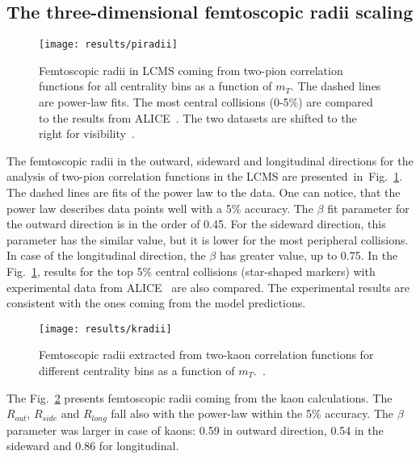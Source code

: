     \subsection{The three-dimensional femtoscopic radii scaling}
      \begin{figure}[b]
        \centering
        \centerline{\texttt{[image: results/piradii]}}
        \caption{Femtoscopic radii in LCMS coming from two-pion correlation functions for all centrality bins as a function of $m_T$. The dashed lines are power-law fits. The most central collisions (0-5\%) are compared to the results from ALICE~\cite{alice_pion}. The two datasets are shifted to the right for visibility~\cite{galazyn}.}
        \label{fig:piradii}
      \end{figure}

      The femtoscopic radii in the outward, sideward and longitudinal directions for the analysis of two-pion correlation functions in the LCMS are presented~in~Fig.~\ref{fig:piradii}.
      The dashed lines are fits of the power law to the data.
      One can notice, that the power law describes data points well with a 5\% accuracy.
      The $\beta$ fit parameter for the outward direction is in the order of 0.45.
      For the sideward direction, this parameter has the similar value, but it is lower for the most peripheral collisions.
      In case of the longitudinal direction, the $\beta$ has greater value, up to 0.75.
      In the Fig.~\ref{fig:piradii}, results for the top 5\% central collisions (star-shaped markers) with experimental data from ALICE~\cite{alice_pion} are also compared.
      The experimental results are consistent with the ones coming from the model predictions.
      \begin{figure}[b]
        \centering
        \centerline{\texttt{[image: results/kradii]}}
        \caption{Femtoscopic radii extracted from two-kaon correlation functions for different centrality bins as a function of $m_T$.~\cite{galazyn}.}
      \label{fig:kradii}
      \end{figure}

      The Fig.~\ref{fig:kradii} presents femtoscopic radii coming from the kaon calculations.
      The $R_{out}$, $R_{side}$ and $R_{long}$ fall also with the power-law within the 5\% accuracy.
      The $\beta$ parameter was larger in case of kaons: 0.59 in outward direction, 0.54 in the sideward and 0.86 for longitudinal.

